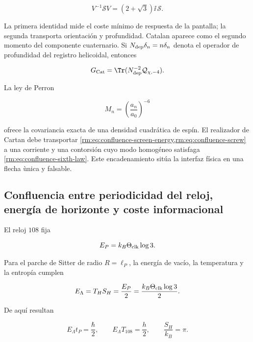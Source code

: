 \begin{equation}
 \boxed{
 V^{-1}\mathscr SV=(2+\sqrt3)\ii\,\mathscr S.}
 \label{rm:eq:confluence-screw}
\end{equation}

La primera identidad mide el coste m\'inimo de respuesta de la pantalla; la
segunda transporta orientaci\'on y profundidad. Catalan aparece como el
segundo momento del componente cuaternario. Si
\(N_{\rm dep}\delta_n=n\delta_n\) denota el operador de profundidad del
registro helicoidal, entonces

\begin{equation}
 G_{\rm Cat}=\Tr(N_{\rm dep}^{-2}\mathcal Q_{\chi,-4}).
 \label{rm:eq:confluence-catalan}
\end{equation}

La ley de Perron

\begin{equation}
 M_n=\left(\frac{a_n}{a_0}\right)^{-6}
 \label{rm:eq:confluence-sixth-law}
\end{equation}

ofrece la covariancia exacta de una densidad cuadr\'atica de esp\'in.  El
realizador de Cartan debe transportar
\cref{rm:eq:confluence-screen-energy,rm:eq:confluence-screw} a una corriente y una
contorsi\'on cuyo modo homog\'eneo satisfaga
\cref{rm:eq:confluence-sixth-law}.  Este encadenamiento sit\'ua la interfaz
f\'isica en una flecha \`unica y falsable.

\subsection{Confluencia entre periodicidad del reloj, energía de horizonte y coste informacional}

El reloj \(108\) fija

\begin{equation}
 E_P=k_B\Theta_{\rm clk}\log3.
 \label{rm:eq:confluence-planck-trit}
\end{equation}

Para el parche de Sitter de radio \(R=\ell_P\), la energ\'ia de vac\'io, la
temperatura y la entrop\'ia cumplen

\begin{equation}
 E_\Lambda=T_H S_H=\frac{E_P}{2}
 =\frac{k_B\Theta_{\rm clk}\log3}{2}.
 \label{rm:eq:confluence-horizon-half}
\end{equation}

De aqu\'i resultan

\begin{equation}
 E_\Lambda t_P=\frac{\hbar}{2},
 \qquad
 E_\Lambda T_{108}=\frac{h}{2},
 \qquad
 \frac{S_H}{k_B}=\pi.
 \label{rm:eq:confluence-half-action}
\end{equation}

